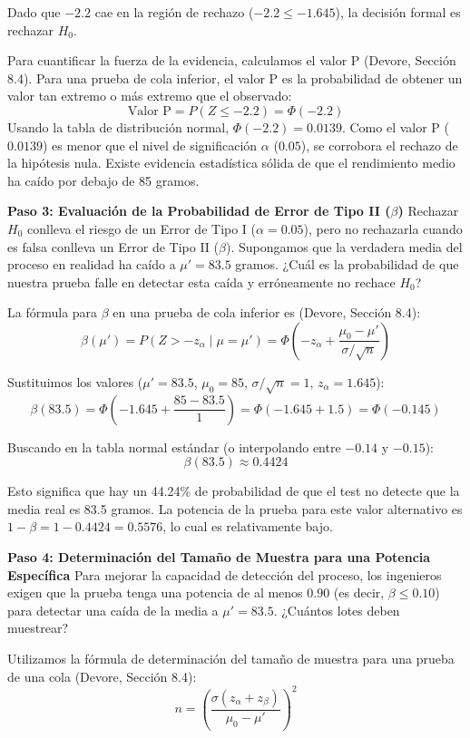 Dado que $-2.2$ cae en la región de rechazo ($-2.2 \le -1.645$), la decisión formal es rechazar $H_0$. 

Para cuantificar la fuerza de la evidencia, calculamos el valor P (Devore, Sección 8.4). Para una prueba de cola inferior, el valor P es la probabilidad de obtener un valor tan extremo o más extremo que el observado:
$$ \text{Valor P} = P(Z \le -2.2) = \Phi(-2.2) $$
Usando la tabla de distribución normal, $\Phi(-2.2) = 0.0139$. 
Como el valor P ($0.0139$) es menor que el nivel de significación $\alpha$ ($0.05$), se corrobora el rechazo de la hipótesis nula. Existe evidencia estadística sólida de que el rendimiento medio ha caído por debajo de 85 gramos.

\textbf{Paso 3: Evaluación de la Probabilidad de Error de Tipo II ($\beta$)}
Rechazar $H_0$ conlleva el riesgo de un Error de Tipo I ($\alpha = 0.05$), pero no rechazarla cuando es falsa conlleva un Error de Tipo II ($\beta$). Supongamos que la verdadera media del proceso en realidad ha caído a $\mu' = 83.5$ gramos. ¿Cuál es la probabilidad de que nuestra prueba falle en detectar esta caída y erróneamente no rechace $H_0$?

La fórmula para $\beta$ en una prueba de cola inferior es (Devore, Sección 8.4):
$$ \beta(\mu') = P(Z > -z_{\alpha} \mid \mu = \mu') = \Phi\left( -z_{\alpha} + \frac{\mu_0 - \mu'}{\sigma / \sqrt{n}} \right) $$

Sustituimos los valores ($\mu' = 83.5$, $\mu_0 = 85$, $\sigma/\sqrt{n} = 1$, $z_{\alpha} = 1.645$):
$$ \beta(83.5) = \Phi\left( -1.645 + \frac{85 - 83.5}{1} \right) = \Phi(-1.645 + 1.5) = \Phi(-0.145) $$

Buscando en la tabla normal estándar (o interpolando entre $-0.14$ y $-0.15$):
$$ \beta(83.5) \approx 0.4424 $$

Esto significa que hay un 44.24\% de probabilidad de que el test no detecte que la media real es 83.5 gramos. La potencia de la prueba para este valor alternativo es $1 - \beta = 1 - 0.4424 = 0.5576$, lo cual es relativamente bajo.

\textbf{Paso 4: Determinación del Tamaño de Muestra para una Potencia Específica}
Para mejorar la capacidad de detección del proceso, los ingenieros exigen que la prueba tenga una potencia de al menos $0.90$ (es decir, $\beta \le 0.10$) para detectar una caída de la media a $\mu' = 83.5$. ¿Cuántos lotes deben muestrear?

Utilizamos la fórmula de determinación del tamaño de muestra para una prueba de una cola (Devore, Sección 8.4):
$$ n = \left( \frac{\sigma (z_{\alpha} + z_{\beta})}{\mu_0 - \mu'} \right)^2 $$

